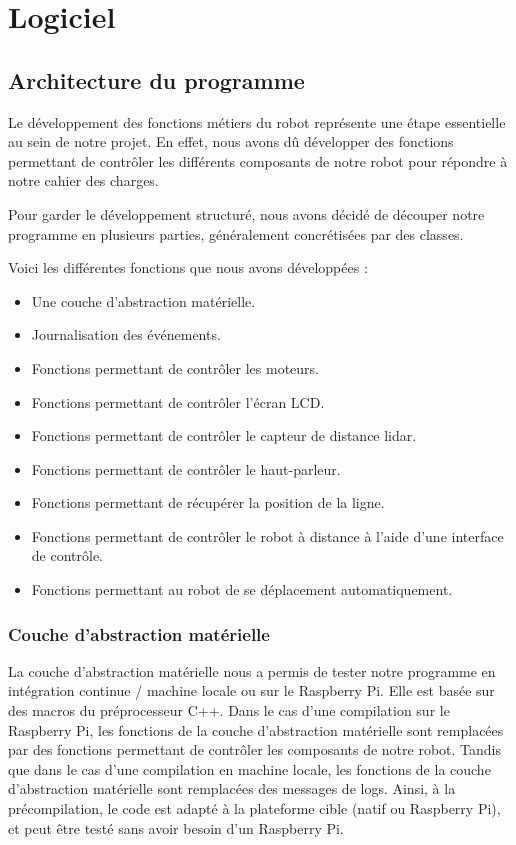 \section{Logiciel}

\subsection{Architecture du programme}

Le développement des fonctions métiers du robot représente une étape essentielle au sein de notre projet.
En effet, nous avons dû développer des fonctions permettant de contrôler les différents composants de notre robot pour répondre à notre cahier des charges.

Pour garder le développement structuré, nous avons décidé de découper notre programme en plusieurs parties, généralement concrétisées par des classes.

Voici les différentes fonctions que nous avons développées :
\begin{itemize}
    \item Une couche d'abstraction matérielle.
    \item Journalisation des événements.
    \item Fonctions permettant de contrôler les moteurs.
    \item Fonctions permettant de contrôler l'écran LCD.
    \item Fonctions permettant de contrôler le capteur de distance lidar.
    \item Fonctions permettant de contrôler le haut-parleur.
    \item Fonctions permettant de récupérer la position de la ligne.
    \item Fonctions permettant de contrôler le robot à distance à l'aide d'une interface de contrôle.
    \item Fonctions permettant au robot de se déplacement automatiquement.
\end{itemize}

\subsubsection{Couche d'abstraction matérielle}

La couche d'abstraction matérielle nous a permis de tester notre programme en intégration continue / machine locale ou sur le Raspberry Pi. 
Elle est basée sur des macros du préprocesseur C++.
Dans le cas d'une compilation sur le Raspberry Pi, les fonctions de la couche d'abstraction matérielle sont remplacées par des fonctions permettant de contrôler les composants de notre robot.
Tandis que dans le cas d'une compilation en machine locale, les fonctions de la couche d'abstraction matérielle sont remplacées des messages de logs.
Ainsi, à la précompilation, le code est adapté à la plateforme cible (natif ou Raspberry Pi), et peut être testé sans avoir besoin d'un Raspberry Pi.

